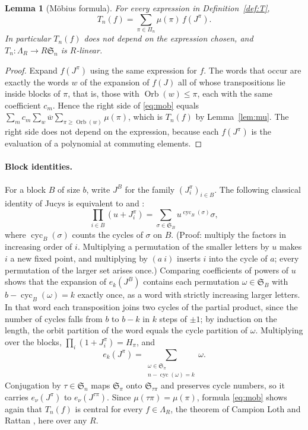 \documentclass[11pt,a4paper]{article}
\newtheorem{lemma}[theorem]{Lemma}
\theoremstyle{definition}
\newcommand{\Sn}{\mathfrak S}
\newcommand{\Pa}{\Pi}
\DeclareMathOperator{\cyc}{cyc}
\DeclareMathOperator{\Orb}{Orb}
\begin{document}
\begin{lemma}[M\"obius formula]\label{lem:mob}
For every expression in Definition~\ref{def:T},
\begin{equation}\label{eq:mob}
 T_n(f)=\sum_{\pi\in\Pa_n}\mu(\pi)\,f(J^\pi).
\end{equation}
In particular $T_n(f)$ does not depend on the expression chosen, and $T_n:\Lambda_R\to R\Sn_n$ is $R$-linear.
\end{lemma}
\begin{proof}
Expand $f(J^\pi)$ using the same expression for $f$. The words that occur are exactly the words $w$ of the expansion of $f(J)$ all of whose transpositions lie inside blocks of $\pi$, that is, those with $\Orb(w)\le\pi$, each with the same coefficient $c_m$. Hence the right side of \eqref{eq:mob} equals $\sum_mc_m\sum_w\overline w\sum_{\pi\ge\Orb(w)}\mu(\pi)$, which is $T_n(f)$ by Lemma~\ref{lem:mu}. The right side does not depend on the expression, because each $f(J^\pi)$ is the evaluation of a polynomial at commuting elements.
\end{proof}

\paragraph{Block identities.} For a block $B$ of size $b$, write $J^B$ for the family $(J^\pi_i)_{i\in B}$. The following classical identity of Jucys is equivalent to \cite[equation~(8)]{jucys} and \cite[Theorem~1]{clr}:
\begin{equation}\label{eq:jucys}
 \prod_{i\in B}(u+J^\pi_i)=\sum_{\sigma\in\Sn_B}u^{\cyc_B(\sigma)}\sigma ,
\end{equation}
where $\cyc_B(\sigma)$ counts the cycles of $\sigma$ on $B$. (Proof: multiply the factors in increasing order of $i$. Multiplying a permutation of the smaller letters by $u$ makes $i$ a new fixed point, and multiplying by $(a\ i)$ inserts $i$ into the cycle of $a$; every permutation of the larger set arises once.) Comparing coefficients of powers of $u$ shows that the expansion of $e_k(J^B)$ contains each permutation $\omega\in\Sn_B$ with $b-\cyc_B(\omega)=k$ exactly once, as a word with strictly increasing larger letters. In that word each transposition joins two cycles of the partial product, since the number of cycles falls from $b$ to $b-k$ in $k$ steps of $\pm1$; by induction on the length, the orbit partition of the word equals the cycle partition of $\omega$. Multiplying over the blocks, $\prod_i(1+J_i^\pi)=H_\pi$, and
\begin{equation}\label{eq:ek}
 e_k(J^\pi)=\sum_{\substack{\omega\in\Sn_\pi\\ n-\cyc(\omega)=k}}\omega .
\end{equation}
Conjugation by $\tau\in\Sn_n$ maps $\Sn_\pi$ onto $\Sn_{\tau\pi}$ and preserves cycle numbers, so it carries $e_\nu(J^\pi)$ to $e_\nu(J^{\tau\pi})$. Since $\mu(\tau\pi)=\mu(\pi)$, formula \eqref{eq:mob} shows again that $T_n(f)$ is central for every $f\in\Lambda_R$, the theorem of Campion Loth and Rattan \cite[Theorem~6]{clr}, here over any $R$.
\end{document}

